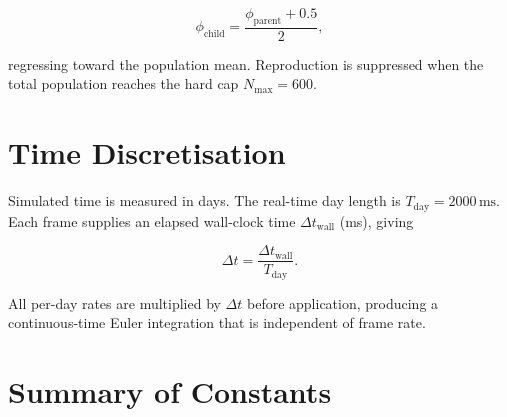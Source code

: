 \documentclass[11pt]{article}
\begin{document}
\[
  \phi_{\mathrm{child}} = \frac{\phi_{\mathrm{parent}} + 0.5}{2},
\]

regressing toward the population mean.  Reproduction is suppressed when the
total population reaches the hard cap $N_{\mathrm{max}} = 600$.

\section{Time Discretisation}

Simulated time is measured in days.  The real-time day length is
$T_{\mathrm{day}} = 2000\,\text{ms}$.  Each frame supplies an elapsed
wall-clock time $\Delta t_{\mathrm{wall}}$ (ms), giving

\[
  \Delta t = \frac{\Delta t_{\mathrm{wall}}}{T_{\mathrm{day}}}.
\]

All per-day rates are multiplied by $\Delta t$ before application, producing a
continuous-time Euler integration that is independent of frame rate.

\section{Summary of Constants}
\end{document}

